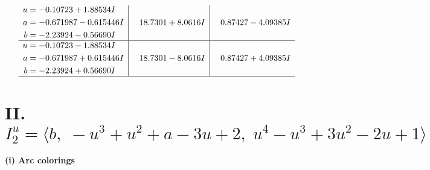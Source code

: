 \documentclass[1p]{elsarticle_modified}
\theoremstyle{definition}
\begin{document}
$$\begin{array}{c|c|c}
\begin{aligned}
u &= -0.10723 + 1.88534 I \\
a &= -0.671987 - 0.615446 I \\
b &= -2.23924 - 0.56690 I\end{aligned}
 & \phantom{-}18.7301 + 8.0616 I & \phantom{-}0.87427 - 4.09385 I \\ \hline\begin{aligned}
u &= -0.10723 - 1.88534 I \\
a &= -0.671987 + 0.615446 I \\
b &= -2.23924 + 0.56690 I\end{aligned}
 & \phantom{-}18.7301 - 8.0616 I & \phantom{-}0.87427 + 4.09385 I\\
 \hline 
 \end{array}$$\newpage\newpage\renewcommand{\arraystretch}{1}
\centering \section*{II. $I^u_{2}= \langle b,\;- u^3+u^2+a-3 u+2,\;u^4- u^3+3 u^2-2 u+1 \rangle$}
\flushleft \textbf{(i) Arc colorings}\\
\end{document}
